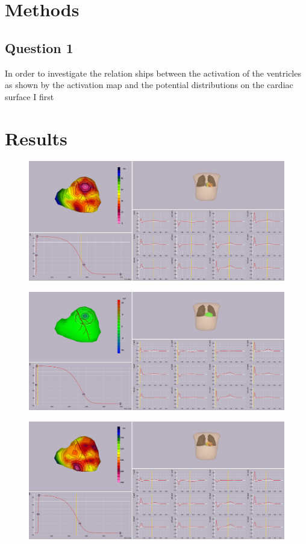 \documentclass[12pt]{article}
\begin{document}
\section{Methods}
\subsection{Question 1}
In order to investigate the relation ships between the activation of the ventricles as shown by the activation map and the potential distributions on the cardiac surface I first 


\section{Results}

\begin{figure}[H]
	
	\centering
	\includegraphics[width = .8\textwidth]{Figures/ActTimes.png}
	\caption{}
	\label{fig:ActT}
\end{figure}

\begin{figure}[H]
	
	\centering
	\includegraphics[width = .8\textwidth]{Figures/ActTimePotentials.png}
	\caption{}
	\label{fig:ActT_pot}
\end{figure}

\begin{figure}[H]
	
	\centering
	\includegraphics[width = .8\textwidth]{Figures/RecoTimes.png}
	\caption{}
	\label{fig:RecT}
\end{figure}
\end{document}
